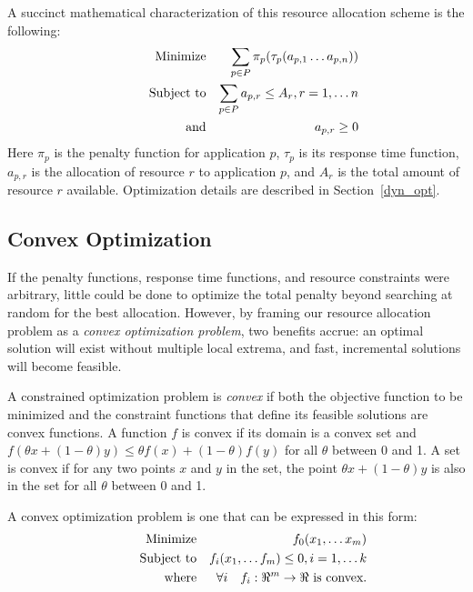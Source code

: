 A succinct mathematical characterization of this resource allocation scheme is the following:
\begin{eqnarray*}
& \makebox[1in][r]{Minimize}   & \sum_{p\in P} {\pi_p(\tau_p(a_{p,1}\ldots a_{p,n}))}  \\
& \makebox[1in][r]{Subject to} & \sum_{p\in P} a_{p,r} \leq A_r, r = 1,\ldots n        \\
& \makebox[1in][r]{and}        & a_{p,r} \geq 0
\end{eqnarray*}
Here $\pi_p$ is the penalty function for application $p$,
$\tau_p$ is its response time function,
$a_{p,r}$ is the allocation of resource $r$ to application $p$,
and $A_r$ is the total amount of resource $r$ available.  Optimization details are described in Section~\ref{dyn_opt}.

\subsection*{Convex Optimization}
If the penalty functions, response time functions, and resource constraints were arbitrary,
little could be done to optimize the total penalty beyond searching at random for the best allocation.
However, by framing our resource allocation problem as a \emph{convex optimization problem}\cite{BoVa},
two benefits accrue: an optimal solution will exist without multiple local extrema, and
fast, incremental solutions will become feasible.

A constrained optimization problem is \emph{convex} if both the objective function to be minimized
and the constraint functions that define its feasible solutions are convex functions.
A function $f$ is convex if its domain is a convex set and
$f(\theta x + (1-\theta)y) \leq \theta f(x) + (1-\theta)f(y)$
for all $\theta$ between 0 and 1.
A set is convex if for any two points $x$ and $y$ in the set, the point
$\theta x + (1-\theta)y$
is also in the set for all $\theta$ between 0 and 1.

A convex optimization problem is one that can be expressed in this form:
\begin{eqnarray*}
& \makebox[1in][r]{Minimize}   & f_0(x_1,\ldots x_m)                              \\
& \makebox[1in][r]{Subject to} & f_i(x_1,\ldots f_m) \leq 0, i = 1,\ldots k        \\
& \makebox[1in][r]{where}      & \forall i \quad f_i:\Re^m \rightarrow \Re \mbox{ is convex.}
\end{eqnarray*}


